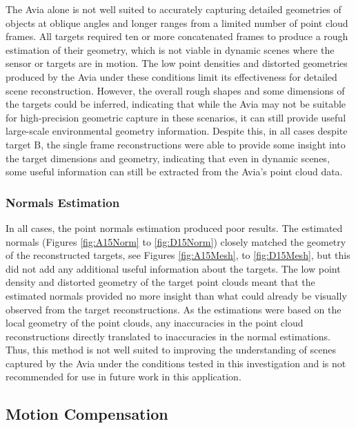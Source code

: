 The Avia alone is not well suited to accurately capturing detailed geometries of objects at oblique angles and longer ranges from a limited number of point cloud frames. All targets required ten or more concatenated frames to produce a rough estimation of their geometry, which is not viable in dynamic scenes where the sensor or targets are in motion. The low point densities and distorted geometries produced by the Avia under these conditions limit its effectiveness for detailed scene reconstruction. However, the overall rough shapes and some dimensions of the targets could be inferred, indicating that while the Avia may not be suitable for high-precision geometric capture in these scenarios, it can still provide useful large-scale environmental geometry information. Despite this, in all cases despite target B, the single frame reconstructions were able to provide some insight into the target dimensions and geometry, indicating that even in dynamic scenes, some useful information can still be extracted from the Avia's point cloud data.

\subsubsection{Normals Estimation}
\label{subsubsec:ch8section1.subsec1.subsubsection2}

In all cases, the point normals estimation produced poor results. The estimated normals (Figures \ref{fig:A15Norm} to \ref{fig:D15Norm}) closely matched the geometry of the reconstructed targets, see Figures \ref{fig:A15Mesh}, to \ref{fig:D15Mesh}, but this did not add any additional useful information about the targets. The low point density and distorted geometry of the target point clouds meant that the estimated normals provided no more insight than what could already be visually observed from the target reconstructions. As the estimations were based on the local geometry of the point clouds, any inaccuracies in the point cloud reconstructions directly translated to inaccuracies in the normal estimations. Thus, this method is not well suited to improving the understanding of scenes captured by the Avia under the conditions tested in this investigation and is not recommended for use in future work in this application.

\subsection{Motion Compensation}
\label{sec:ch8.section1.subsection2}

